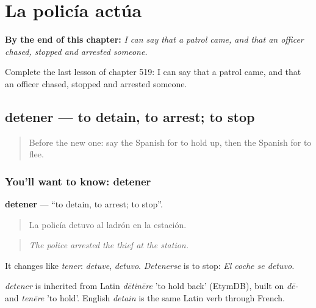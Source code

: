
\chapter{La policía actúa}
\label{ch:es-la-policia-actua}

\begin{chapteropening}
\textbf{By the end of this chapter:} \emph{I can say that a patrol came, and that an officer chased, stopped and arrested someone.}

Complete the last lesson of chapter 519: I can say that a patrol came, and that an officer chased, stopped and arrested someone.
\end{chapteropening}

\section[detener]{detener — to detain, to arrest; to stop}

\label{lesson:ES-C519-detener}



\begin{quote}
Before the new one: say the Spanish for to hold up, then the Spanish for to flee.
\end{quote}

\subsection*{You'll want to know: detener}
\textbf{detener} — \textquotedblleft{}to detain, to arrest; to stop\textquotedblright{}.

\begin{quote}
La policía detuvo al ladrón en la estación.
\end{quote}

\begin{quote}
\emph{The police arrested the thief at the station.}
\end{quote}

It changes like \emph{tener}: \emph{detuve}, \emph{detuvo}. \emph{Detenerse} is to stop: \emph{El coche se detuvo.}

\begin{cousinweb}
\emph{detener} is inherited from Latin \emph{dētinēre} 'to hold back' (EtymDB), built on \emph{dē-} and \emph{tenēre} 'to hold'. English \emph{detain} is the same Latin verb through French.
\end{cousinweb}

